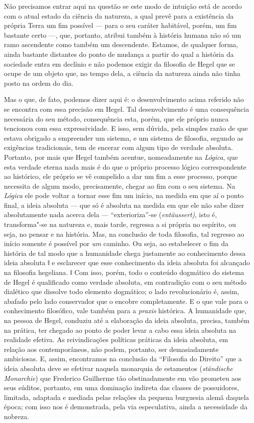 Não precisamos entrar aqui na questão se este modo de intuição está de
acordo com o atual estado da ciência da natureza, a qual prevê para a
existência da própria Terra um fim possível --- para o seu caráter
habitável, porém, um fim bastante certo ---, que, portanto, atribui também
à história humana não só um ramo ascendente como também um descendente.
Estamos, de qualquer forma, ainda bastante distantes do ponto de mudança
a partir do qual a história da sociedade entra em declínio e não podemos
exigir da filosofia
de Hegel que
se ocupe de um objeto que, no tempo dela, a ciência da natureza ainda
não tinha posto na ordem do dia.

Mas o que, de fato, podemos dizer aqui é: o desenvolvimento acima
referido não se encontra com essa precisão
em Hegel.
Tal desenvolvimento é uma consequência necessária do seu método,
consequência esta, porém, que ele próprio nunca tencionou com essa
expressividade. E isso, sem dúvida, pela simples razão de que estava
obrigado a empreender um sistema, e um sistema de filosofia, segundo as
exigências tradicionais, tem de encerar com algum tipo de verdade
absoluta. Portanto, por mais que Hegel também acentue, nomeadamente
na \emph{Lógica}, que esta verdade eterna
nada mais é do que o próprio processo lógico correspondente ao
histórico, ele próprio se vê compelido a dar um fim a esse processo,
porque necessita de algum modo, precisamente, chegar ao fim com o seu
sistema. Na \emph{Lógica} ele pode voltar a tornar esse fim um início,
na medida em que aí o ponto final, a ideia absoluta --- que só é absoluta
na medida em que ele não sabe dizer absolutamente nada acerca dela ---
``exterioriza''-se (\emph{entäussert)}, isto é, transforma"-se na
natureza e, mais tarde, regressa a si própria no espírito, ou seja, no
pensar e na história. Mas, na conclusão de toda filosofia, tal regresso
ao início somente é possível por \emph{um} caminho. Ou seja, ao
estabelecer o fim da história de tal modo que a humanidade chega
justamente ao conhecimento dessa ideia absoluta ǁ e esclarecer que esse
conhecimento da ideia absoluta foi alcançado na filosofia hegeliana. ǁ
Com isso, porém, todo o conteúdo dogmático do sistema
de Hegel é
qualificado como verdade absoluta, em contradição com o seu método
dialético que dissolve todo elemento dogmático; o lado revolucionário é,
assim, abafado pelo lado conservador que o encobre completamente. E o
que vale para o conhecimento filosófico, vale também para a
\emph{praxis} histórica. A humanidade que, na pessoa
de Hegel,
conduziu até a elaboração da ideia absoluta, precisa, também na prática,
ter chegado ao ponto de poder levar a cabo essa ideia absoluta na
realidade efetiva. As reivindicações políticas práticas da ideia
absoluta, em relação aos contemporâneos, não podem, portanto, ser
demasiadamente ambiciosas. E, assim, encontramos na conclusão
da ``Filosofia do Direito''\emph{ }que a ideia absoluta deve se efetivar
naquela monarquia de estamentos (\emph{ständische Monarchie})
que Frederico Guilherme  tão obstinadamente em vão prometeu aos seus súditos,
portanto, em uma dominação indireta das classes de possuidores,
limitada, adaptada e mediada pelas relações da pequena burguesia alemã
daquela época; com isso nos é demonstrada, pela via especulativa, ainda
a necessidade da nobreza.


